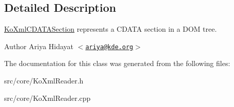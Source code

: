\subsection{Detailed Description}
\hyperlink{classKoXmlCDATASection}{KoXmlCDATASection} represents a CDATA section in a DOM tree. \begin{DoxyAuthor}{Author}
Ariya Hidayat $<$\href{mailto:ariya@kde.org}{\tt ariya@kde.org}$>$ 
\end{DoxyAuthor}


The documentation for this class was generated from the following files:\begin{DoxyCompactItemize}
\item 
src/core/KoXmlReader.h\item 
src/core/KoXmlReader.cpp\end{DoxyCompactItemize}
